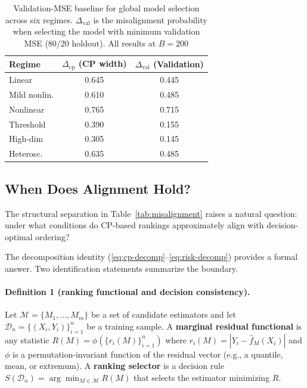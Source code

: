\documentclass[pdflatex,sn-mathphys-ay]{sn-jnl}%
\theoremstyle{thmstyleone}%
\theoremstyle{thmstyletwo}%
\theoremstyle{thmstylethree}%
\begin{document}
\begin{table}[t]
    \centering
    \caption{Validation-MSE baseline for global model selection across six regimes. $\Delta_{\text{val}}$ is the misalignment probability when selecting the model with minimum validation MSE (80/20 holdout). All results at $B=200$}
    \label{tab:val-baseline}
    \begin{tabular}{lcc}
        \toprule
        Regime & $\Delta_{\text{cp}}$ (CP width) & $\Delta_{\text{val}}$ (Validation) \\
        \midrule
        Linear       & 0.645 & 0.445 \\
        Mild nonlin.   & 0.610 & 0.485 \\
        Nonlinear    & 0.765 & 0.715 \\
        Threshold    & 0.390 & 0.155 \\
        High-dim     & 0.305 & 0.145 \\
        Heterosc.    & 0.635 & 0.485 \\
        \bottomrule
    \end{tabular}
\end{table}

\subsection{When Does Alignment Hold?}
\label{sec:boundary}

The structural separation in Table~\ref{tab:misalignment} raises a natural question: under what conditions do CP-based rankings approximately align with decision-optimal ordering?

The decomposition identity (\eqref{eq:cp-decomp}--\eqref{eq:risk-decomp}) provides a formal answer. Two identification statements summarize the boundary.

\paragraph{Definition 1 (ranking functional and decision consistency).}
Let $\mathcal{M} = \{M_1, \ldots, M_m\}$ be a set of candidate estimators and let $\mathcal{D}_n = \{(X_i, Y_i)\}_{i=1}^n$ be a training sample. A \textbf{marginal residual functional} is any statistic $R(M) = \phi(\{r_i(M)\}_{i=1}^n)$ where $r_i(M) = |Y_i - \hat{f}_M(X_i)|$ and $\phi$ is a permutation-invariant function of the residual vector (e.g., a quantile, mean, or extremum). A \textbf{ranking selector} is a decision rule $S(\mathcal{D}_n) = \arg\min_{M \in \mathcal{M}} R(M)$ that selects the estimator minimizing $R$.
\end{document}
